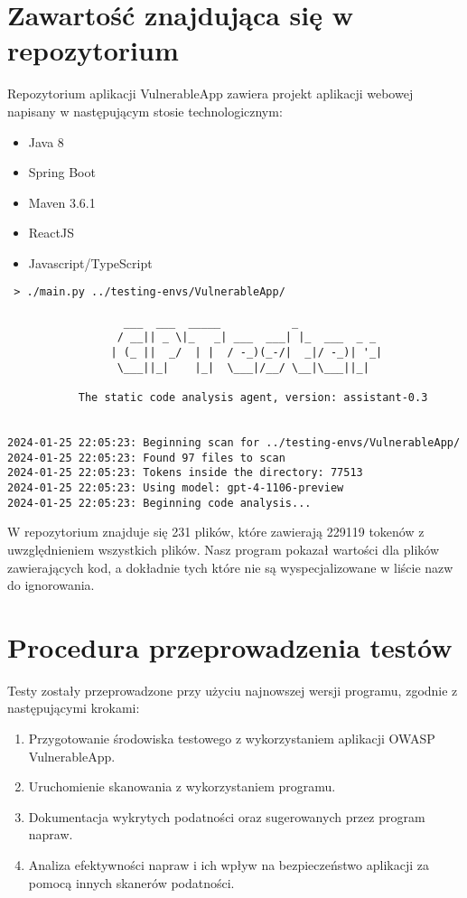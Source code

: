 \section{Zawartość znajdująca się w repozytorium}
Repozytorium aplikacji VulnerableApp zawiera projekt aplikacji webowej napisany w następującym stosie technologicznym:
\begin{itemize}
    \item Java 8
    \item Spring Boot
    \item Maven 3.6.1
    \item ReactJS
    \item Javascript/TypeScript
\end{itemize} 

\begin{verbatim}
 > ./main.py ../testing-envs/VulnerableApp/

                  ___  ___  _____           _             
                 / __|| _ \|_   _| ___  ___| |_  ___  _ _ 
                | (_ ||  _/  | |  / -_)(_-/|  _|/ -_)| '_|
                 \___||_|    |_|  \___|/__/ \__|\___||_|  

           The static code analysis agent, version: assistant-0.3


2024-01-25 22:05:23: Beginning scan for ../testing-envs/VulnerableApp/
2024-01-25 22:05:23: Found 97 files to scan
2024-01-25 22:05:23: Tokens inside the directory: 77513
2024-01-25 22:05:23: Using model: gpt-4-1106-preview
2024-01-25 22:05:23: Beginning code analysis...
\end{verbatim}

W repozytorium znajduje się 231 plików, które zawierają 229119 tokenów z uwzględnieniem wszystkich plików. Nasz program pokazał wartości dla plików zawierających kod, a dokładnie tych które nie są wyspecjalizowane w liście nazw do ignorowania.

\section{Procedura przeprowadzenia testów}
Testy zostały przeprowadzone przy użyciu najnowszej wersji programu, zgodnie z następującymi krokami:

\begin{enumerate}
    \item Przygotowanie środowiska testowego z wykorzystaniem aplikacji OWASP VulnerableApp.
    \item Uruchomienie skanowania z wykorzystaniem programu.
    \item Dokumentacja wykrytych podatności oraz sugerowanych przez program napraw.
    \item Analiza efektywności napraw i ich wpływ na bezpieczeństwo aplikacji za pomocą innych skanerów podatności.
\end{enumerate}

